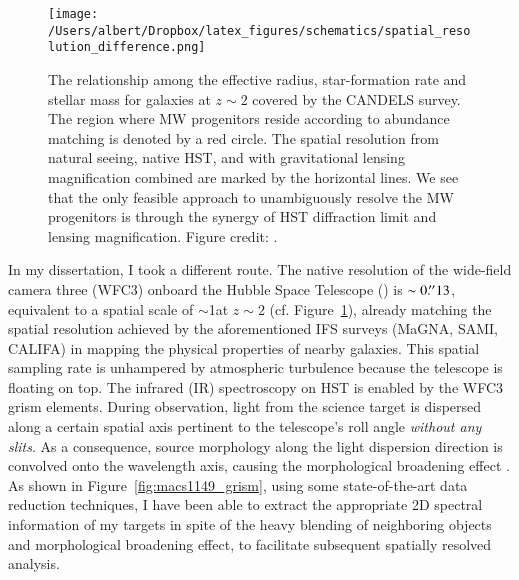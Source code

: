 \begin{figure}
    \centering
    \texttt{[image: /Users/albert/Dropbox/latex\_figures/schematics/spatial\_resolution\_difference.png]}
    \caption[The relationship among the effective radius, star-formation rate and stellar mass for galaxies at
    $z\sim2$.]{The relationship among the effective radius, star-formation rate and stellar mass for galaxies at $z\sim2$ covered by the CANDELS survey.
    The region where MW progenitors reside according to abundance matching is denoted by a red circle.
    The spatial resolution from natural seeing, native HST, and with gravitational lensing magnification combined
    are marked by the horizontal lines.
    We see that the only feasible approach to unambiguously resolve the MW progenitors is through the synergy of HST
    diffraction limit and lensing magnification.
    Figure credit: \citet{Wuyts:2012iw}.
    \label{fig:spatial_resolution}}
\end{figure}

In my dissertation, I took a different route.  The native resolution of the wide-field camera three (WFC3)
onboard the Hubble Space Telescope (\hst) is $\sim0\mbox{$.\!^{\prime\prime}$}13$, equivalent to a spatial scale of $\sim$1\kpc at
$z\sim2$ (cf.  Figure~\ref{fig:spatial_resolution}), already matching the spatial resolution achieved by the
aforementioned IFS surveys (\ie MaGNA, SAMI, CALIFA) in mapping the physical properties of nearby galaxies.  This
spatial sampling rate is unhampered by atmospheric turbulence because the telescope is floating on top.  The
infrared (IR) spectroscopy on HST is enabled by the WFC3 grism elements.  During observation, light from the
science target is dispersed along a certain spatial axis pertinent to the telescope's roll angle \emph{without
any slits}.  As a consequence, source morphology along the light dispersion direction is convolved onto the
wavelength axis, causing the morphological broadening effect \citep{vanDokkum:2011cq}.  As shown in
Figure~\ref{fig:macs1149_grism}, using some state-of-the-art data reduction techniques, I have been able to
extract the appropriate 2D spectral information of my targets in spite of the heavy blending of neighboring
objects and morphological broadening effect, to facilitate subsequent spatially resolved analysis.

